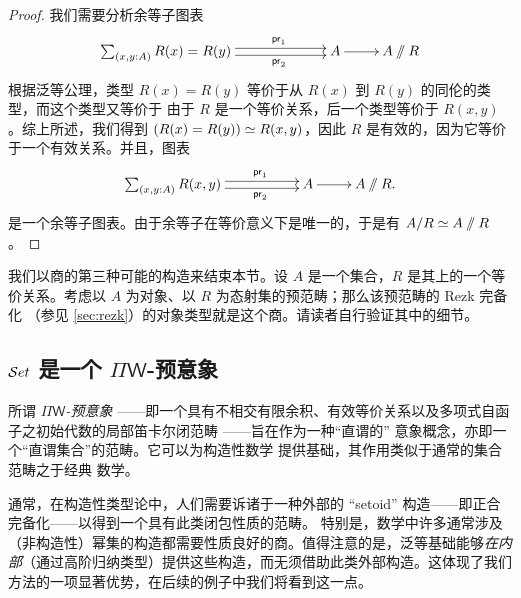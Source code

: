 \begin{proof}
我们需要分析余等子图表
\begin{equation*}
  \xymatrix{
    **[l]{\sm{x,y:A} R (x)= R (y)}
    \ar@<0.25em>[r]^{\proj1}
    \ar@<-0.25em>[r]_{\proj2}
    &
    {A}
    \ar[r]
    &
    {A \sslash R}
  }
\end{equation*}
根据泛等公理，类型 $R(x) = R(y)$ 等价于从 $R(x)$ 到 $R(y)$ 的同伦的类型，而这个类型又等价于
由于 $R$ 是一个等价关系，后一个类型等价于 $R(x,y)$。综上所述，我们得到 $(R(x) = R(y)) \simeq R(x,y)$，因此 $R$ 是有效的，因为它等价于一个有效关系。并且，图表
\begin{equation*}
  \xymatrix{
    **[l]{\sm{x,y:A} R(x, y)}
    \ar@<0.25em>[r]^{\proj1}
    \ar@<-0.25em>[r]_{\proj2}
    &
    {A}
    \ar[r]
    &
    {A \sslash R.}
  }
\end{equation*}
是一个余等子图表。由于余等子在等价意义下是唯一的，于是有 $A/R \simeq A\sslash  R $。
\end{proof}

我们以商的第三种可能的构造来结束本节。设 $A$ 是一个集合，$R$ 是其上的一个等价关系。考虑以 $A$ 为对象、以 $R$ 为态射集的预范畴；那么该预范畴的 Rezk 完备化
%
（参见 \cref{sec:rezk}）的对象类型就是这个商。请读者自行验证其中的细节。

%
%
%

\subsection{\texorpdfstring{$\mathcal{S}et$}{Set} 是一个 \texorpdfstring{$\Pi\mathsf{W}$}{ΠW}-预意象}
\label{subsec:piw}

%

所谓 \emph{$\Pi\mathsf{W}$-预意象}
%
——即一个具有不相交有限余积、有效等价关系以及多项式自函子之初始代数的局部笛卡尔闭范畴
%
%
——旨在作为一种“直谓的”
%
意象概念，亦即一个“直谓集合”的范畴。它可以为构造性数学
%
提供基础，其作用类似于通常的集合范畴之于经典
%
数学。

通常，在构造性类型论中，人们需要诉诸于一种外部的 ``setoid'' 构造——即正合完备化——以得到一个具有此类闭包性质的范畴。
%
  特别是，数学中许多通常涉及（非构造性）幂集的构造都需要性质良好的商。值得注意的是，泛等基础能够\emph{在内部}（通过高阶归纳类型）提供这些构造，而无须借助此类外部构造。这体现了我们方法的一项显著优势，在后续的例子中我们将看到这一点。

